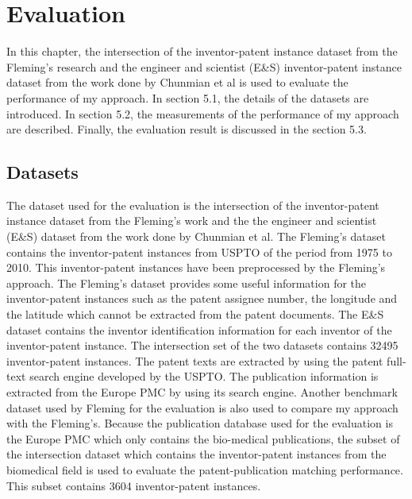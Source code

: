 \chapter{Evaluation}
\label{cha:eval}
In this chapter, the intersection of the inventor-patent instance dataset from the Fleming's research and the engineer and scientist (E\&S) inventor-patent instance dataset from the work done by Chunmian et al is used to evaluate the performance of my approach.  In section 5.1, the details of the datasets are introduced. In section 5.2, the measurements of the performance of my approach are described. Finally, the evaluation result is discussed in the section 5.3. 

\section{Datasets}
The dataset used for the evaluation is the intersection of the inventor-patent instance dataset from the Fleming's work and the the engineer and scientist (E\&S) dataset from the work done by Chunmian et al. The Fleming's dataset contains the inventor-patent instances from USPTO of the period from 1975 to 2010. This inventor-patent instances have been preprocessed by the Fleming's approach. The Fleming's dataset provides some useful information for the inventor-patent instances such as the patent assignee number, the longitude and the latitude which cannot be extracted from the patent documents. The E\&S dataset contains the inventor identification information for each inventor of the inventor-patent instance.  The intersection set of the two datasets contains 32495 inventor-patent instances. The patent texts are extracted by using the patent full-text search engine developed by the USPTO.  The publication information is extracted from the Europe PMC by using its search engine. Another benchmark dataset \cite{RePEc:eee:respol:v:43:y:2014:i:6:p:941-955} used by Fleming for the evaluation is also used to compare my approach with the Fleming's. Because the publication database used for the evaluation is the Europe PMC which only contains the bio-medical publications, the subset of the intersection dataset which contains the inventor-patent instances from the biomedical field is used to evaluate the patent-publication matching performance. This subset contains 3604 inventor-patent instances. 

